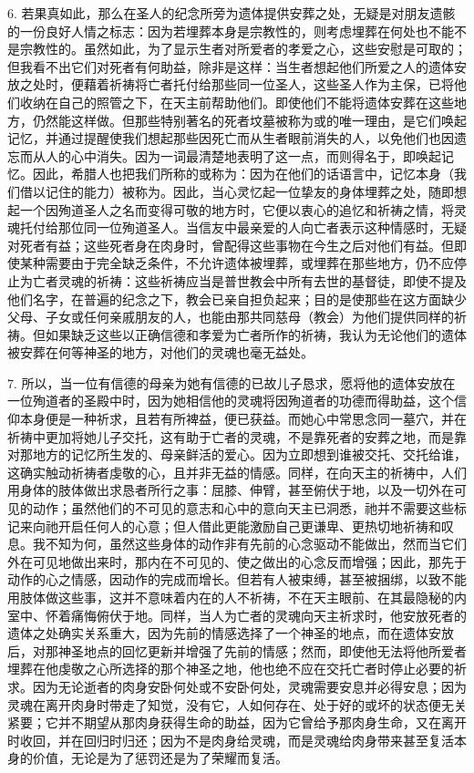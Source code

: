 6. 若果真如此，那么在圣人的纪念所旁为遗体提供安葬之处，无疑是对朋友遗骸的一份良好人情之标志：因为若埋葬本身是宗教性的，则考虑埋葬在何处也不能不是宗教性的。虽然如此，为了显示生者对所爱者的孝爱之心，这些安慰是可取的；但我看不出它们对死者有何助益，除非是这样：当生者想起他们所爱之人的遗体安放之处时，便藉着祈祷将亡者托付给那些同一位圣人，这些圣人作为主保，已将他们收纳在自己的照管之下，在天主前帮助他们。即使他们不能将遗体安葬在这些地方，仍然能这样做。但那些特别著名的死者坟墓被称为或的唯一理由，是它们唤起记忆，并通过提醒使我们想起那些因死亡而从生者眼前消失的人，以免他们也因遗忘而从人的心中消失。因为一词最清楚地表明了这一点，而则得名于，即唤起记忆。因此，希腊人也把我们所称的或称为：因为在他们的话语言中，记忆本身（我们借以记住的能力）被称为。因此，当心灵忆起一位挚友的身体埋葬之处，随即想起一个因殉道圣人之名而变得可敬的地方时，它便以衷心的追忆和祈祷之情，将灵魂托付给那位同一位殉道圣人。当信友中最亲爱的人向亡者表示这种情感时，无疑对死者有益；这些死者身在肉身时，曾配得这些事物在今生之后对他们有益。但即使某种需要由于完全缺乏条件，不允许遗体被埋葬，或埋葬在那些地方，仍不应停止为亡者灵魂的祈祷：这些祈祷应当是普世教会中所有去世的基督徒，即使不提及他们名字，在普遍的纪念之下，教会已亲自担负起来；目的是使那些在这方面缺少父母、子女或任何亲戚朋友的人，也能由那共同慈母（教会）为他们提供同样的祈祷。但如果缺乏这些以正确信德和孝爱为亡者所作的祈祷，我认为无论他们的遗体被安葬在何等神圣的地方，对他们的灵魂也毫无益处。\par

7. 所以，当一位有信德的母亲为她有信德的已故儿子恳求，愿将他的遗体安放在一位殉道者的圣殿中时，因为她相信他的灵魂将因殉道者的功德而得助益，这个信仰本身便是一种祈求，且若有所裨益，便已获益。而她心中常思念同一墓穴，并在祈祷中更加将她儿子交托，这有助于亡者的灵魂，不是靠死者的安葬之地，而是靠对那地方的记忆所生发的、母亲鲜活的爱心。因为立即想到谁被交托、交托给谁，这确实触动祈祷者虔敬的心，且并非无益的情感。同样，在向天主的祈祷中，人们用身体的肢体做出求恳者所行之事：屈膝、伸臂，甚至俯伏于地，以及一切外在可见的动作；虽然他们的不可见的意志和心中的意向天主已洞悉，祂并不需要这些标记来向祂开启任何人的心意；但人借此更能激励自己更谦卑、更热切地祈祷和叹息。我不知为何，虽然这些身体的动作非有先前的心念驱动不能做出，然而当它们外在可见地做出来时，那内在不可见的、使之做出的心念反而增强；因此，那先于动作的心之情感，因动作的完成而增长。但若有人被束缚，甚至被捆绑，以致不能用肢体做这些事，这并不意味着内在的人不祈祷，不在天主眼前、在其最隐秘的内室中、怀着痛悔俯伏于地。同样，当人为亡者的灵魂向天主祈求时，他安放死者的遗体之处确实关系重大，因为先前的情感选择了一个神圣的地点，而在遗体安放后，对那神圣地点的回忆更新并增强了先前的情感；然而，即使他无法将他所爱者埋葬在他虔敬之心所选择的那个神圣之地，他也绝不应在交托亡者时停止必要的祈求。因为无论逝者的肉身安卧何处或不安卧何处，灵魂需要安息并必得安息；因为灵魂在离开肉身时带走了知觉，没有它，人如何存在、处于好的或坏的状态便无关紧要；它并不期望从那肉身获得生命的助益，因为它曾给予那肉身生命，又在离开时收回，并在回归时归还；因为不是肉身给灵魂，而是灵魂给肉身带来甚至复活本身的价值，无论是为了惩罚还是为了荣耀而复活。\par

